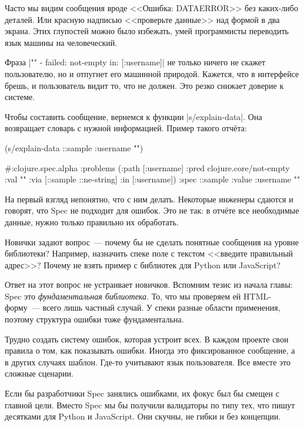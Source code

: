 Часто мы видим сообщения вроде <<Ошибка: DATAERROR>> без каких-либо деталей. Или
красную надписью <<проверьте данные>> над формой в два экрана. Этих глупостей
можно было избежать, умей программисты переводить язык машины на человеческий.


Фраза \spverb|"" - failed: not-empty in: [:username]| не только ничего не скажет
пользователю, но и отпугнет его машинной природой. Кажется, что в интерфейсе
брешь, и пользователь видит то, что не должен. Это резко снижает доверие к
системе.

Чтобы составить сообщение, вернемся к функции \spverb|s/explain-data|.  Она
возвращает словарь с нужной информацией. Пример такого отч\"{е}та:

\begin{english}
  \begin{clojure}
(s/explain-data ::sample {:username ""})

#:clojure.spec.alpha
{:problems
 ({:path [:username]
   :pred clojure.core/not-empty
   :val ""
   :via [::sample ::ne-string]
   :in [:username]})
 :spec ::sample
 :value {:username ""}}
  \end{clojure}
\end{english}


На первый взгляд непонятно, что с ним делать. Некоторые инженеры сдаются и
говорят, что Spec не подходит для ошибок. Это не так: в отч\"{е}те все необходимые
данные, нужно только правильно их обработать.

Новички задают вопрос~--- почему бы не сделать понятные сообщения на уровне
библиотеки? Например, назначить спеке поле с текстом <<введите правильный
адрес>>? Почему не взять пример с библиотек для Python или JavaScript?


Ответ на этот вопрос не устраивает новичков. Вспомним тезис из начала главы:
Spec это \emph{фундаментальная библиотека}. То, что мы проверяем ей
HTML-форму~--- всего лишь частный случай. У спеки разные области применения,
поэтому структура ошибки тоже фундаментальна.

Трудно создать систему ошибок, которая устроит всех. В каждом проекте свои
правила о том, как показывать ошибки. Иногда это фиксированное сообщение, а в
других случаях шаблон. Где-то учитывают язык пользователя. Все вместе это
сложные сценарии.

Если бы разработчики Spec занялись ошибками, их фокус был бы смещен с главной
цели. Вместо Spec мы бы получили валидаторы по типу тех, что пишут десятками для
Python и JavaScript. Они скучны, не гибки и без концепции.

